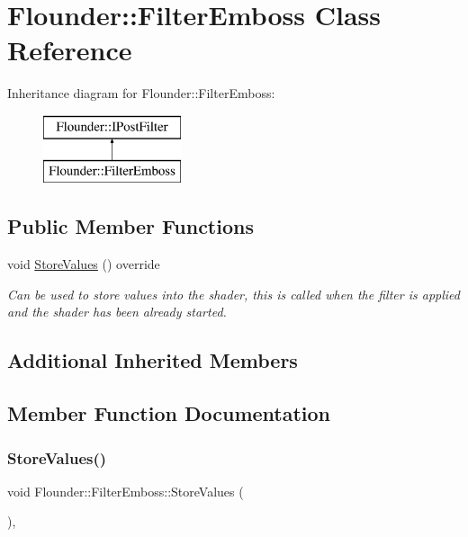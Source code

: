 \hypertarget{class_flounder_1_1_filter_emboss}{}\section{Flounder\+:\+:Filter\+Emboss Class Reference}
\label{class_flounder_1_1_filter_emboss}
Inheritance diagram for Flounder\+:\+:Filter\+Emboss\+:\begin{figure}[H]
\begin{center}
\leavevmode
\includegraphics[height=2.000000cm]{class_flounder_1_1_filter_emboss}
\end{center}
\end{figure}
\subsection*{Public Member Functions}
\begin{DoxyCompactItemize}
\item 
void \hyperlink{class_flounder_1_1_filter_emboss_a9c4275819e1a997423c808669bede6a9}{Store\+Values} () override
\begin{DoxyCompactList}\small\item\em Can be used to store values into the shader, this is called when the filter is applied and the shader has been already started. \end{DoxyCompactList}\end{DoxyCompactItemize}
\subsection*{Additional Inherited Members}


\subsection{Member Function Documentation}
\mbox{\label{class_flounder_1_1_filter_emboss_a9c4275819e1a997423c808669bede6a9}} 
\subsubsection{\texorpdfstring{Store\+Values()}{StoreValues()}}
{\footnotesize\ttfamily void Flounder\+::\+Filter\+Emboss\+::\+Store\+Values (\begin{DoxyParamCaption}{ }\end{DoxyParamCaption})\hspace{0.3cm}{\ttfamily [override]}, {\ttfamily [virtual]}}



